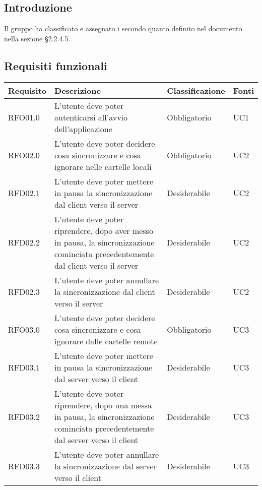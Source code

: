 \subsection{Introduzione}
Il gruppo \gruppo{} ha classificato e assegnato i  secondo quanto definito nel documento \NdP{} \versNdP{} nella sezione \S{}2.2.4.5.

\subsection{Requisiti funzionali}
{
    \setlength{\freewidth}{\dimexpr\textwidth-8\tabcolsep}
    \renewcommand{\arraystretch}{1.5}
    \centering
    \setlength{\aboverulesep}{0pt}
    \setlength{\belowrulesep}{0pt}
    \begin{longtable}{C{.20\freewidth} C{.40\freewidth} C{.20\freewidth} C{.20\freewidth}}
        \toprule 
        \textbf{Requisito} & \textbf{Descrizione} & \textbf{Classificazione} & \textbf{Fonti} \\
        \toprule
        \endhead

        RFO01.0  & L'utente deve poter autenticarsi all'avvio dell'applicazione & Obbligatorio & UC1 \\

        RFO02.0  & L'utente deve poter decidere cosa sincronizzare e cosa ignorare nelle cartelle locali & Obbligatorio & UC2 \\
        RFD02.1  & L'utente deve poter mettere in pausa la sincronizzazione dal client verso il server & Desiderabile & UC2 \\
        RFD02.2  & L'utente deve poter riprendere, dopo aver messo in pausa, la sincronizzazione cominciata precedentemente dal client verso il server & Desiderabile & UC2 \\
        RFD02.3  & L'utente deve poter annullare la sincronizzazione dal client verso il server & Desiderabile & UC2 \\

        RFO03.0  & L'utente deve poter decidere cosa sincronizzare e cosa ignorare dalle cartelle remote & Obbligatorio & UC3 \\
        RFD03.1  & L'utente deve poter mettere in pausa la sincronizzazione dal server verso il client & Desiderabile & UC3 \\
        RFD03.2  & L'utente deve poter riprendere, dopo una messa in pausa, la sincronizzazione cominciata precedentemente dal server verso il client & Desiderabile & UC3 \\
        RFD03.3  & L'utente deve poter annullare la sincronizzazione dal server verso il client & Desiderabile & UC3 \\


\end{longtable}}
